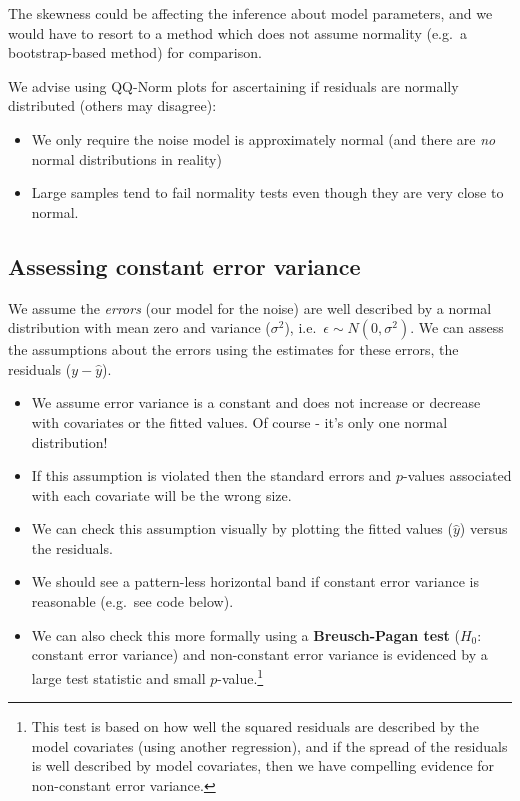 \documentclass[
  oneside]{krantz}
\providecommand{\tightlist}{%
  \setlength{\itemsep}{0pt}\setlength{\parskip}{0pt}}
\begin{document}
The skewness could be affecting the inference about model parameters, and we would have to resort to a method which does not assume normality (e.g.~a bootstrap-based method) for comparison.

We advise using QQ-Norm plots for ascertaining if residuals are normally distributed (others may disagree):

\begin{itemize}
\tightlist
\item
  We only require the noise model is approximately normal (and there are \emph{no} normal distributions in reality)
\item
  Large samples tend to fail normality tests even though they are very close to normal.
\end{itemize}

\hypertarget{assessing-constant-error-variance}{%
\subsection{Assessing constant error variance}\label{assessing-constant-error-variance}}

We assume the \emph{errors} (our model for the noise) are well described by a normal distribution with mean zero and variance (\(\sigma^2\)), i.e.~\(\epsilon \sim N(0,\sigma^2)\). We can assess the assumptions about the errors using the estimates for these errors, the residuals (\(y-\hat{y}\)).

\begin{itemize}
\item
  We assume error variance is a constant and does not increase or decrease with covariates or the fitted values. Of course - it's only one normal distribution!
\item
  If this assumption is violated then the standard errors and \(p\)-values associated with each covariate will be the wrong size.
\item
  We can check this assumption visually by plotting the fitted values (\(\hat{y}\)) versus the residuals.
\item
  We should see a pattern-less horizontal band if constant error variance is reasonable (e.g.~see code below).
\item
  We can also check this more formally using a \textbf{Breusch-Pagan test} (\(H_0\): constant error variance) and non-constant error variance is evidenced by a large test statistic and small \(p\)-value.\footnote{This test is based on how well the squared residuals are described by the model covariates (using another regression), and if the spread of the residuals is well described by model covariates, then we have compelling evidence for non-constant error variance.}
\end{itemize}
\end{document}
